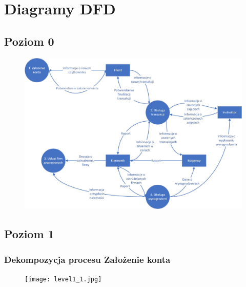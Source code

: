 \documentclass[a4paper,11pt]{article}
\begin{document}
\section{Diagramy DFD}
\subsection{Poziom 0}
    \begin{figure}[!htb]
    \centerline{\includegraphics[scale=0.9]{level0.jpg}}
    \label{fig:level0}
    \end{figure}
\newpage



\subsection{Poziom 1}
\subsubsection{Dekompozycja procesu Założenie konta}
    \begin{figure}[!htb]
    \centerline{\texttt{[image: level1\_1.jpg]}}
    \label{fig:level1_1}
    \end{figure}
    \newpage
\end{document}

